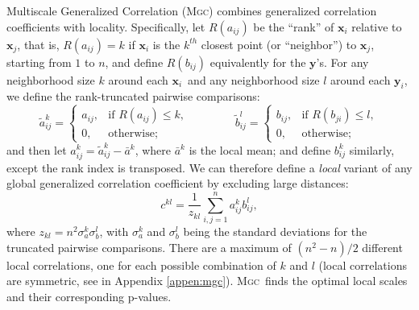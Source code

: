 \documentclass[11pt]{article}
\providecommand{\sct}[1]{{\normalfont\textsc{#1}}}
\providecommand{\mt}[1]{\widetilde{#1}}
\providecommand{\mb}[1]{\boldsymbol{#1}}
\newcommand{\G}{c}
\newcommand{\Mgc}{\sct{Mgc}}
\newcommand{\mby}{\ensuremath{\mb{y}}}
\begin{document}
Multiscale Generalized Correlation (\Mgc) combines generalized correlation coefficients with locality.
Specifically, let $R(a_{ij})$  be the ``rank'' of $\mb{x}_i$ relative to $\mb{x}_j$, that is, $R(a_{ij})=k$ if $\mb{x}_i$ is the $k^{th}$ closest point (or ``neighbor'') to $\mb{x}_j$, starting from $1$ to $n$, and define $R(b_{ij})$ equivalently for the \mby's. For any neighborhood size $k$ around each $\mb{x}_i$~and any neighborhood size $l$ around each $\mb{y}_i$, we define the rank-truncated pairwise comparisons:
\begin{equation}
\label{localCoef2}
    \mt{a}_{ij}^k=
    \begin{cases}
      a_{ij}, & \text{if } R(a_{ij}) \leq k, \\
      0, & \text{otherwise};
    \end{cases} \qquad \qquad
    \mt{b}_{ij}^l=
    \begin{cases}
      b_{ij}, & \text{if } R(b_{ji}) \leq l, \\
      0, & \text{otherwise};
    \end{cases}
\end{equation}
and then let $a^k_{ij}=\mt{a}^k_{ij} - \bar{a}^k$, 
where $\bar{a}^k$ is the local mean;
and define $b^k_{ij}$ similarly, except the rank index is transposed. 
We can therefore define a \emph{local} variant of any global generalized correlation coefficient by  excluding large distances: %
\begin{equation}
\label{localCoef}
\G^{kl}=\dfrac{1}{z_{kl}} {\textstyle \sum_{i,j=1}^n a_{ij}^k b_{ij}^l},
\end{equation}
where $z_{kl}=n^2 \sigma_a^k \sigma_b^l$,  with $\sigma_a^k$ and $\sigma_b^{l}$ being the standard deviations for the truncated pairwise comparisons. There are a maximum of $(n^2-n)/2$ different local correlations, one for each possible combination of $k$ and $l$ (local correlations are symmetric, see in Appendix \ref{appen:mgc}).
\Mgc~finds the optimal local scales and their corresponding p-values.
\end{document}
